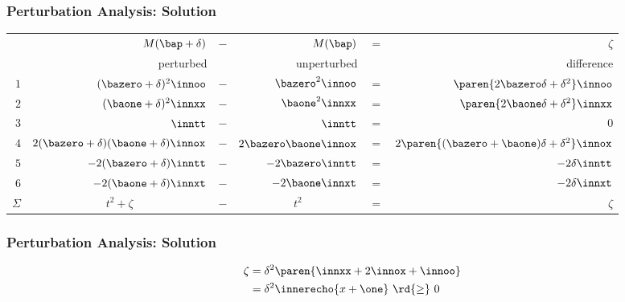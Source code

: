 \begin{frame}\frametitle{Perturbation Analysis: Solution}
\footnotesize{
\begin{table}[!t]
	\begin{center}
		\begin{tabular}{rrcrc r}
			& $M(\bap + \delta)$ & $-$ & $M(\bap)$  & $=$ & $\zeta$ \\
			& perturbed && unperturbed && difference \\\hline
			$1$ & $(\bazero + \delta)^{2}\innoo$ & $-$ & $\bazero^{2} \innoo$ & $=$ & $\paren{ 2\bazero \delta + \delta^{2}} \innoo$\\
			$2$ & $(\baone + \delta)^{2}\innxx$ & $-$ & $\baone^{2} \innxx$ & $=$ & $\paren{ 2\baone \delta + \delta^{2}} \innxx$\\
			$3$ & $\inntt$ & $-$ & $\inntt$ & $=$ & $0$\\
			$4$ & $2 (\bazero + \delta) (\baone + \delta) \innox$ & $-$ & $2 \bazero \baone \innox$ & $=$ & $2 \paren{ (\bazero+ \baone)\delta  +  \delta^{2}} \innox $ \\
			$5$ & $-2 (\bazero + \delta) \inntt $ & $-$ & $-2 \bazero  \inntt $ & $=$ & $ -2 \delta \inntt $\\
			$6$ & $ -2 (\baone + \delta) \innxt $ & $-$ & $ -2 \baone  \innxt $ & $=$ & $ -2 \delta \innxt $\\ \hline
			$\Sigma$ & \multicolumn{1}{c}{$t^{2} + \zeta$} &$-$ & \multicolumn{1}{c}{$t^{2}$} &$=$& $\zeta$
		\end{tabular}
	\end{center}
\label{tab:perturbations}
\end{table}}
\end{frame}
%
%
\begin{frame}\frametitle{Perturbation Analysis: Solution}
\begin{equation}
\begin{split}
	\zeta 
		&= \delta^{2} \paren{ \innxx + 2\innox + \innoo} \\
		&= \delta^{2} \innerecho{x+\one} \ \rd{ \ge } \ 0
\end{split}
\label{eq:complex linear function}
\end{equation}
\end{frame}
